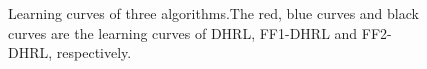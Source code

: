 \documentclass[preprint,12pt]{elsarticle}
\begin{document}
\begin{figure}[hp]
\begin{centering}
{\begin{centering}
\par\end{centering}
}
\par\end{centering}
\centering{}
\caption{Learning curves of three algorithms.The red, blue curves and black curves are the learning curves of DHRL, FF1-DHRL and FF2-DHRL, respectively.}
\label{fig:Learning-curves}
\end{figure}



\end{document}
